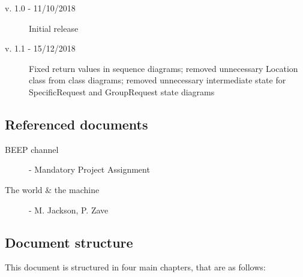 \documentclass[../main.tex]{subfiles}
\begin{document}
\begin{description}
	\item [v. 1.0 - 11/10/2018] Initial release
	\item [v. 1.1 - 15/12/2018] Fixed return values in sequence diagrams; removed unnecessary Location class from class diagrams; removed unnecessary intermediate state for SpecificRequest and GroupRequest state diagrams
\end{description}

\subsection{Referenced documents}

\begin{minipage}{\textwidth}
\begin{description}
	\item [BEEP channel] - Mandatory Project Assignment
	\item [The world \& the machine] - M. Jackson, P. Zave
\end{description}
\end{minipage}

\subsection{Document structure}

This document is structured in four main chapters, that are as follows:
\end{document}
